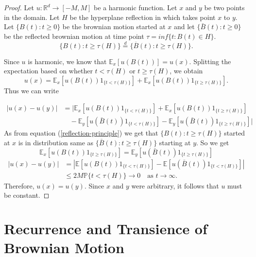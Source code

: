 \documentclass[11pt, a4paper, oneside]{report}
\numberwithin{equation}{section}
\begin{document}
\begin{proof}
Let \(u : \mathbb{R}^d \to [-M,M]\) be a harmonic function. Let \(x\) and \(y\) be two points in the domain. Let \(H\) be the hyperplane reflection in which takes point \(x\) to \(y\). Let \(\{B(t) : t \geq 0\}\) be the brownian motion started at \(x\) and let  \(\{\bar{B}(t) : t \geq 0\}\) be the reflected brownian motion at time point \(\tau = inf \{t : B(t) \in H\}\). 
\begin{equation}\label{reflection-principle}
\{B(t) : t \geq \tau(H)\} \overset{d}{=} \{\overline{B}(t) : t \geq \tau(H)\}. 
\end{equation}

Since \( u \) is harmonic, we know that \( \mathbb{E}_x[u(B(t))] = u(x) \). Splitting the expectation based on whether \( t < \tau(H) \) or \( t \geq \tau(H) \), we obtain
\[
u(x) = \mathbb{E}_x\left[u(B(t)) {1}_{\{t < \tau(H)\}} \right] + \mathbb{E}_x\left[u(B(t)) {1}_{\{t \geq \tau(H)\}} \right].
\]
Thus we can write 

\begin{align*}
|u(x)-u(y)| 
&= \Big| \mathbb{E}_x\left[u(B(t)) {1}_{\{t < \tau(H)\}} \right] 
+ \mathbb{E}_x\left[u(B(t)) {1}_{\{t \geq \tau(H)\}}\right] \\
&\quad - \mathbb{E}_y\left[u(\bar{B}(t)) {1}_{\{t < \tau(H)\}} \right] 
- \mathbb{E}_y\left[u(\bar{B}(t)) {1}_{\{t \geq \tau(H)\}} \right] \Big|
\end{align*}
\noindent As from equation (\ref{reflection-principle}) we get that \(\{B(t) : t \geq \tau(H)\}\) started at \(x\) is in distribution same as \(\{\bar{B}(t) : t \geq \tau(H)\}\) starting at \(y\). So we get 
\[
\mathbb{E}_x\left[u(B(t)) {1}_{\{t \geq \tau(H)\}}\right] = \mathbb{E}_y\left[u(\bar{B}(t)) {1}_{\{t \geq \tau(H)\}} \right] 
\]
\begin{align*}
|u(x) - u(y)| 
&= \left| \mathbb{E}\left[u(B(t)) {1}_{\{t < \tau(H)\}}\right] 
- \mathbb{E}\left[u(\bar{B}(t)) {1}_{\{t < \tau(H)\}}\right] \right| \\
&\leq 2M \mathbb{P}\{t < \tau(H)\} \longrightarrow 0 \quad \text{as } t \to \infty.
\end{align*}
Therefore, \( u(x) = u(y) \). Since \( x \) and \( y \) were arbitrary, it follows that \( u \) must be constant.
\end{proof}

\chapter{Recurrence and Transience of Brownian Motion}
\end{document}
